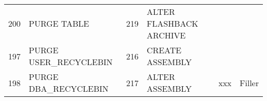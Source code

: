 \begin{longtable}[]{@{}llllll@{}}
\begin{minipage}[t]{0.06\columnwidth}
200\strut
\end{minipage} & \begin{minipage}[t]{0.24\columnwidth}\raggedright\strut
PURGE TABLE\strut
\end{minipage} & \begin{minipage}[t]{0.06\columnwidth}\raggedright\strut
219\strut
\end{minipage} & \begin{minipage}[t]{0.24\columnwidth}\raggedright\strut
ALTER FLASHBACK ARCHIVE\strut
\end{minipage}\tabularnewline
\begin{minipage}[t]{0.16\columnwidth}\raggedright\strut
197\strut
\end{minipage} & \begin{minipage}[t]{0.16\columnwidth}\raggedright\strut
PURGE USER\_RECYCLEBIN\strut
\end{minipage} & \begin{minipage}[t]{0.16\columnwidth}\raggedright\strut
216\strut
\end{minipage} & \begin{minipage}[t]{0.16\columnwidth}\raggedright\strut
CREATE ASSEMBLY\strut
\end{minipage} & \begin{minipage}[t]{0.16\columnwidth}\raggedright\strut
\strut
\end{minipage} & \begin{minipage}[t]{0.16\columnwidth}\raggedright\strut
\strut
\end{minipage}\tabularnewline
\begin{minipage}[t]{0.06\columnwidth}\raggedright\strut
198\strut
\end{minipage} & \begin{minipage}[t]{0.19\columnwidth}\raggedright\strut
PURGE DBA\_RECYCLEBIN\strut
\end{minipage} & \begin{minipage}[t]{0.06\columnwidth}\raggedright\strut
217\strut
\end{minipage} & \begin{minipage}[t]{0.24\columnwidth}\raggedright\strut
ALTER ASSEMBLY\strut
\end{minipage} & \begin{minipage}[t]{0.06\columnwidth}\raggedright\strut
xxx\strut
\end{minipage} & \begin{minipage}[t]{0.24\columnwidth}\raggedright\strut
Filler\strut
\end{minipage}\tabularnewline
\bottomrule
\end{longtable}


